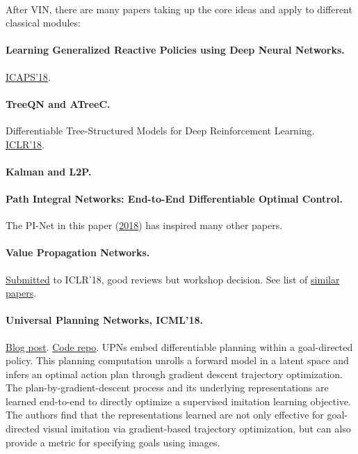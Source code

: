\documentclass[12pt]{article}
\numberwithin{equation}{section}
\begin{document}
~

\noindent After VIN, there are many papers taking up the core ideas and apply to different classical modules:

\paragraph{Learning Generalized Reactive Policies using Deep Neural Networks.} \href{https://www.semanticscholar.org/paper/Learning-Generalized-Reactive-Policies-using-Deep-Groshev-Tamar/aebcd81be09f6e99b21e6c6869949673ab6f4343}{ICAPS'18}.  

\paragraph{TreeQN and ATreeC.} Differentiable Tree-Structured Models for Deep Reinforcement Learning. \href{https://openreview.net/forum?id=H1dh6Ax0Z}{ICLR'18}.

\paragraph{Kalman and L2P.}

\paragraph{Path Integral Networks: End-to-End Differentiable Optimal Control.} The PI-Net in this paper (\href{https://www.semanticscholar.org/paper/Path-Integral-Networks%3A-End-to-End-Differentiable-Okada-Rigazio/696ec77d7bcf5b71039877e07dbbdb341d04b4e3?navId=citing-papers}{2018}) has inspired many other papers.

\paragraph{Value Propagation Networks.} \href{https://openreview.net/forum?id=Bya8fGWAZ}{Submitted} to ICLR'18, good reviews but workshop decision. See list of \href{https://www.semanticscholar.org/paper/Value-Propagation-Networks-Nardelli-Synnaeve/3db81ca3076dc8a63d7e9447402c297a5a0fdfcc?navId=similar-papers}{similar papers}.

\paragraph{Universal Planning Networks, ICML'18.} \href{https://sites.google.com/view/upn-public/home}{Blog post}. \href{https://github.com/aravind0706/upn}{Code repo}.  UPNs embed differentiable planning within a goal-directed policy. This planning computation unrolls a forward model in a latent space and infers an optimal action plan through gradient descent trajectory optimization. The plan-by-gradient-descent process and its underlying representations are learned end-to-end to directly optimize a supervised imitation learning objective. The authors find that the representations learned are not only effective for goal-directed visual imitation via gradient-based trajectory optimization, but can also provide a metric for specifying goals using images.
\end{document}
